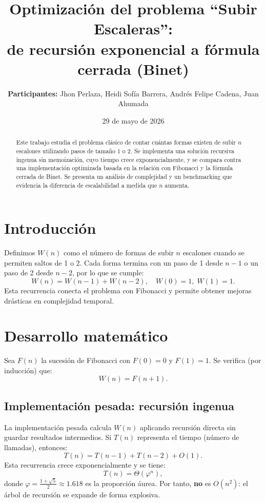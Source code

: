 \documentclass[twocolumn]{article}
\title{\textbf{Optimización del problema ``Subir Escaleras''}:\\
de recursión exponencial a fórmula cerrada (Binet)}
\author{\textbf{Participantes:} Jhon Perlaza, Heidi Sofía Barrera, Andrés Felipe Cadena, Juan Ahumada}
\date{29 de mayo de 2026}
\begin{document}
\maketitle

\begin{abstract}
Este trabajo estudia el problema clásico de contar cuántas formas existen de subir $n$ escalones utilizando pasos de tamaño 1 o 2. Se implementa una solución recursiva ingenua sin memoización, cuyo tiempo crece exponencialmente, y se compara contra una implementación optimizada basada en la relación con Fibonacci y la fórmula cerrada de Binet. Se presenta un análisis de complejidad y un benchmarking que evidencia la diferencia de escalabilidad a medida que $n$ aumenta.
\end{abstract}

\section{Introducción}
Definimos $W(n)$ como el número de formas de subir $n$ escalones cuando se permiten saltos de 1 o 2. Cada forma termina con un paso de 1 desde $n-1$ o un paso de 2 desde $n-2$, por lo que se cumple:
\begin{equation}
W(n) = W(n-1) + W(n-2), \quad W(0)=1,\; W(1)=1.
\end{equation}
Esta recurrencia conecta el problema con Fibonacci y permite obtener mejoras drásticas en complejidad temporal.

\section{Desarrollo matemático}
Sea $F(n)$ la sucesión de Fibonacci con $F(0)=0$ y $F(1)=1$. Se verifica (por inducción) que:
\begin{equation}
W(n)=F(n+1).
\end{equation}

\subsection{Implementación pesada: recursión ingenua}
La implementación pesada calcula $W(n)$ aplicando recursión directa sin guardar resultados intermedios. Si $T(n)$ representa el tiempo (número de llamadas), entonces:
\begin{equation}
T(n)=T(n-1)+T(n-2)+O(1).
\end{equation}
Esta recurrencia crece exponencialmente y se tiene:
\begin{equation}
T(n)=\Theta(\varphi^n),
\end{equation}
donde $\varphi=\frac{1+\sqrt{5}}{2}\approx 1.618$ es la proporción áurea. Por tanto, \textbf{no} es $O(n^2)$: el árbol de recursión se expande de forma explosiva.
\end{document}
